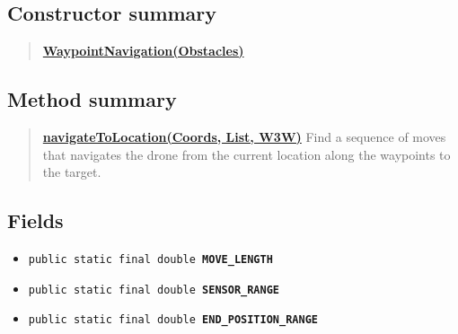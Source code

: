\documentclass[11pt,a4paper]{report}
\begin{document}
{{{{{{{{{{{{{{{{\subsection{Constructor summary}{
\begin{verse}
\hyperlink{uk.ac.ed.inf.aqmaps.flightplanning.WaypointNavigation(uk.ac.ed.inf.aqmaps.noflyzone.Obstacles)}{{\bf WaypointNavigation(Obstacles)}} \\
\end{verse}
}
\subsection{Method summary}{
\begin{verse}
\hyperlink{uk.ac.ed.inf.aqmaps.flightplanning.WaypointNavigation.navigateToLocation(uk.ac.ed.inf.aqmaps.geometry.Coords, java.util.List, uk.ac.ed.inf.aqmaps.W3W)}{{\bf navigateToLocation(Coords, List, W3W)}} Find a sequence of moves that navigates the drone from the current location along the waypoints to the target.\\
\end{verse}
}
\subsection{Fields}{
\begin{itemize}
\item{
\label{uk.ac.ed.inf.aqmaps.flightplanning.WaypointNavigation.MOVE_LENGTH}\hypertarget{uk.ac.ed.inf.aqmaps.flightplanning.WaypointNavigation.MOVE_LENGTH}{\texttt{public static final double\ {\bf  MOVE\_LENGTH}}
}
}
\item{
\label{uk.ac.ed.inf.aqmaps.flightplanning.WaypointNavigation.SENSOR_RANGE}\hypertarget{uk.ac.ed.inf.aqmaps.flightplanning.WaypointNavigation.SENSOR_RANGE}{\texttt{public static final double\ {\bf  SENSOR\_RANGE}}
}
}
\item{
\label{uk.ac.ed.inf.aqmaps.flightplanning.WaypointNavigation.END_POSITION_RANGE}\hypertarget{uk.ac.ed.inf.aqmaps.flightplanning.WaypointNavigation.END_POSITION_RANGE}{\texttt{public static final double\ {\bf  END\_POSITION\_RANGE}}
}
}
\end{itemize}
}
}}}}}}}}}}}}}}}}
\end{document}
